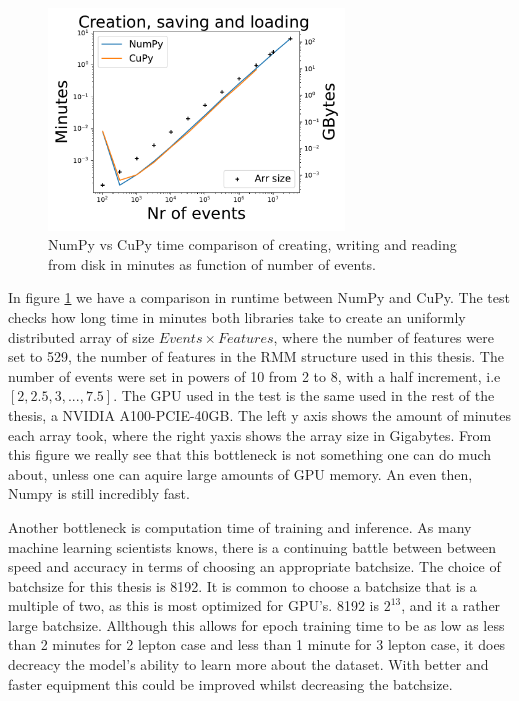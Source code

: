 \begin{figure}[H]
    \caption[NumPy vs CuPy time comparison]{NumPy vs CuPy time comparison of creating, writing and reading from disk in minutes as function of 
    number of events.}
    \label{fig:cupy_comp}
    \centering
    \includegraphics[width=0.7\textwidth]{Figures/atlas/cupy_testing.pdf}
\end{figure}

In figure \ref{fig:cupy_comp} we have a comparison in runtime between NumPy and CuPy. The test checks how long time 
in minutes both libraries take to create an uniformly distributed array of size $Events\times Features$, where the 
number of features were set to 529, the number of features in the RMM structure used in this thesis. The number of events 
were set in powers of 10 from 2 to 8, with a half increment, i.e $[2, 2.5, 3, ..., 7.5]$. The GPU used in the test 
is the same used in the rest of the thesis, a NVIDIA A100-PCIE-40GB. The left y axis shows the amount of minutes 
each array took, where the right yaxis shows the array size in Gigabytes. From this figure we really see that this 
bottleneck is not something one can do much about, unless one can aquire large amounts of GPU memory. An even then, 
Numpy is still incredibly fast. \par 
Another bottleneck is computation time of training and inference. As many machine learning scientists knows, 
there is a continuing battle between between speed and accuracy in terms of choosing an appropriate batchsize. 
The choice of batchsize for this thesis is 8192. It is common to choose a batchsize that is a multiple of two, 
as this is most optimized for GPU's. 8192 is $2^{13}$, and it a rather large batchsize. Allthough this allows for 
epoch training time to be as low as less than 2 minutes for 2 lepton case and less than 1 minute for 3 lepton case,
it does decreacy the model's ability to learn more about the dataset. With better and faster equipment this could 
be improved whilst decreasing the batchsize. 



